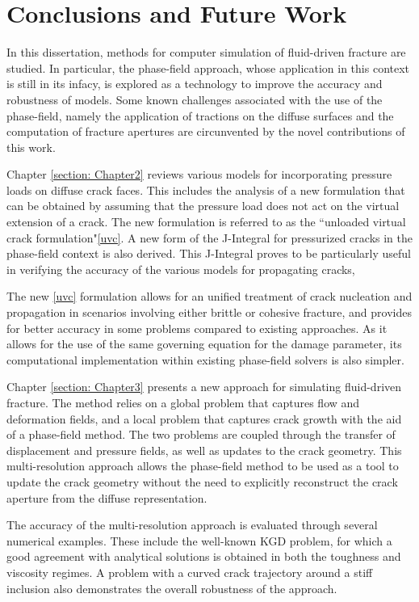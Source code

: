 \chapter{Conclusions and Future Work}
\label{section: Conclusion}

In this dissertation, methods for computer simulation of fluid-driven fracture are studied. In particular, the phase-field approach, whose application in this context is still in its infacy, is explored as a technology to improve the accuracy and robustness of models. Some known challenges associated with the use of the phase-field, namely the application of tractions on the diffuse surfaces and the computation of fracture apertures are circunvented by the novel contributions of this work. 

Chapter \ref{section: Chapter2} reviews various models for incorporating pressure loads on diffuse crack faces. This includes the analysis of a new formulation that can be obtained by assuming that the pressure load does not act on the virtual extension of a crack. The new formulation is referred to as the 
 ``unloaded virtual crack formulation"\eqref{uvc}. A new form of the J-Integral for pressurized cracks in the phase-field context is also derived. This J-Integral proves to be particularly useful in verifying the accuracy of the various models for propagating cracks,

The new \eqref{uvc} formulation allows for an unified treatment of crack nucleation and propagation in scenarios involving either brittle or cohesive fracture, and provides for better accuracy in some problems compared to existing approaches. As it allows for the use of the same governing equation for the damage parameter, its computational implementation within existing phase-field solvers is also simpler. 

Chapter \ref{section: Chapter3} presents a new approach for simulating fluid-driven fracture. The method relies on a global problem that captures flow and deformation fields, and a local problem that captures crack growth with the aid of a phase-field method. The two problems are coupled through the transfer of displacement and pressure fields, as well as updates to the crack geometry. This multi-resolution approach allows the phase-field method to be used as a tool to update the crack geometry without the need to explicitly reconstruct the crack aperture from the diffuse representation.  

The accuracy of the multi-resolution approach is evaluated through several numerical examples. These include the well-known KGD problem, for which a good agreement with analytical solutions is obtained in both the toughness and viscosity regimes. A problem with a curved crack trajectory around a stiff inclusion also demonstrates the overall robustness of the approach.  


